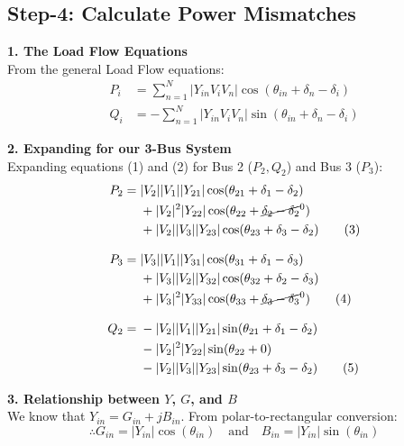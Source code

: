 \documentclass[11pt]{article}
\begin{document}
\subsection*{Step-4: Calculate Power Mismatches}

\begin{stepbox}
\textbf{1. The Load Flow Equations} \\
From the general Load Flow equations:
\begin{align}
    P_i &= \sum_{n=1}^{N} |Y_{in} V_i V_n| \cos(\theta_{in} + \delta_n - \delta_i) \tag{1} \\
    Q_i &= -\sum_{n=1}^{N} |Y_{in} V_i V_n| \sin(\theta_{in} + \delta_n - \delta_i) \tag{2}
\end{align}

\textbf{2. Expanding for our 3-Bus System} \\
Expanding equations (1) and (2) for Bus 2 ($P_2, Q_2$) and Bus 3 ($P_3$):
\begin{align}
    P_2 =\;& |V_2||V_1||Y_{21}| \cos(\theta_{21} + \delta_1 - \delta_2) \nonumber \\
    &+ |V_2|^2|Y_{22}| \cos(\theta_{22} + \cancel{\delta_2 - \delta_2}^0) \nonumber \\
    &+ |V_2||V_3||Y_{23}| \cos(\theta_{23} + \delta_3 - \delta_2) \tag{3} \\[0.3cm]
    P_3 =\;& |V_3||V_1||Y_{31}| \cos(\theta_{31} + \delta_1 - \delta_3) \nonumber \\
    &+ |V_3||V_2||Y_{32}| \cos(\theta_{32} + \delta_2 - \delta_3) \nonumber \\
    &+ |V_3|^2|Y_{33}| \cos(\theta_{33} + \cancel{\delta_3 - \delta_3}^0) \tag{4} \\[0.3cm]
    Q_2 =\;& -|V_2||V_1||Y_{21}| \sin(\theta_{21} + \delta_1 - \delta_2) \nonumber \\
    &- |V_2|^2|Y_{22}| \sin(\theta_{22} + 0) \nonumber \\
    &- |V_2||V_3||Y_{23}| \sin(\theta_{23} + \delta_3 - \delta_2) \tag{5}
\end{align}

\textbf{3. Relationship between $Y$, $G$, and $B$} \\
We know that $Y_{in} = G_{in} + jB_{in}$. From polar-to-rectangular conversion:
\begin{equation*}
    \therefore G_{in} = |Y_{in}|\cos(\theta_{in}) \quad \text{and} \quad B_{in} = |Y_{in}|\sin(\theta_{in})
\end{equation*}



\end{stepbox}
\end{document}
